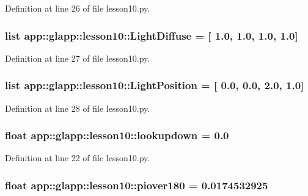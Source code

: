 Definition at line 26 of file lesson10.py.
\subsubsection{\setlength{\rightskip}{0pt plus 5cm}list {\bf app::glapp::lesson10::LightDiffuse} = [ 1.0, 1.0, 1.0, 1.0]\hspace{0.3cm}{\tt  [static]}}\label{namespaceapp_1_1glapp_1_1lesson10_acf27c9220e5eb18ca87656fefc67417}




Definition at line 27 of file lesson10.py.
\subsubsection{\setlength{\rightskip}{0pt plus 5cm}list {\bf app::glapp::lesson10::LightPosition} = [ 0.0, 0.0, 2.0, 1.0]\hspace{0.3cm}{\tt  [static]}}\label{namespaceapp_1_1glapp_1_1lesson10_526feb2406c300346ae343f66a0b582a}




Definition at line 28 of file lesson10.py.
\subsubsection{\setlength{\rightskip}{0pt plus 5cm}float {\bf app::glapp::lesson10::lookupdown} = 0.0\hspace{0.3cm}{\tt  [static]}}\label{namespaceapp_1_1glapp_1_1lesson10_c12611051dbd2c89b2ae08fc2c1d959c}




Definition at line 22 of file lesson10.py.
\subsubsection{\setlength{\rightskip}{0pt plus 5cm}float {\bf app::glapp::lesson10::piover180} = 0.0174532925\hspace{0.3cm}{\tt  [static]}}\label{namespaceapp_1_1glapp_1_1lesson10_f8b74a8e37503b1a83c3d73efcfeb333}




